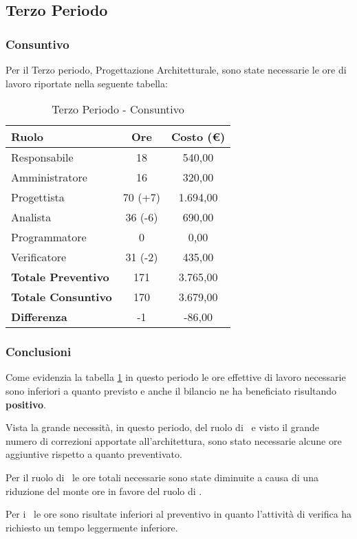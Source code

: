 \documentclass[../PianoDiProgetto.tex]{subfiles}
\begin{document}
	\subsection{Terzo Periodo}
		\subsubsection{Consuntivo}
		Per il Terzo periodo, Progettazione Architetturale, sono state necessarie le ore di lavoro riportate nella seguente tabella:
		
		\begin{table}[h]
				\centering
				\begin{tabular}{l * {2}{c}}
					\toprule
					\textbf{Ruolo} & \textbf{Ore} & \textbf{Costo (\euro{})} \\
					\midrule
					Responsabile & 18 & 540,00 \\

					Amministratore & 16 & 320,00 \\

					Progettista & 70 (+7) & 1.694,00 \\

					Analista & 36 (-6) & 690,00 \\		

					Programmatore & 0 & 0,00 \\		

					Verificatore & 31 (-2) & 435,00 \\				
					\midrule		
					\textbf{Totale Preventivo} & 171 & 3.765,00 \\
					\textbf{Totale Consuntivo} & 170 & 3.679,00 \\
					\midrule
					\textbf{Differenza} & -1 & -86,00 \\
					\bottomrule
				\end{tabular}
				\caption{Terzo Periodo - Consuntivo}
				\label{tab:consuntivo3}	
			\end{table}
		
		\subsubsection{Conclusioni}
		Come evidenzia la tabella \ref{tab:consuntivo3} in questo periodo le ore effettive di lavoro necessarie sono inferiori a quanto previsto e anche il bilancio ne ha beneficiato risultando \textbf{positivo}.
		
			Vista la grande necessità, in questo periodo, del ruolo di \progettista\ e visto il grande numero di correzioni apportate all'architettura, sono stato necessarie alcune ore aggiuntive rispetto a quanto preventivato. 
			
			Per il ruolo di \analista\ le ore totali necessarie sono state diminuite a causa di una riduzione del monte ore in favore del ruolo di \progettista.
			
			Per i \verificatori\ le ore sono risultate inferiori al preventivo in quanto l'attività di verifica ha richiesto un tempo leggermente inferiore. 
		
\end{document}
